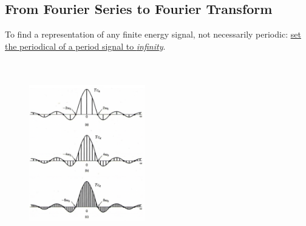 \documentclass[12pt,a4paper]{article}
\begin{document}
\subsection{From Fourier Series to Fourier Transform}
\begin{tcolorbox}[breakable]
To find a representation of any finite energy signal, not necessarily periodic: \underline{set the periodical of a period signal to \textit{infinity}}.\\

\\\\

\begin{figure}
\includegraphics[width = 0.45\textwidth]{images/tincrease} \vspace{-3cm} \end{figure}


\end{tcolorbox}
\end{document}
